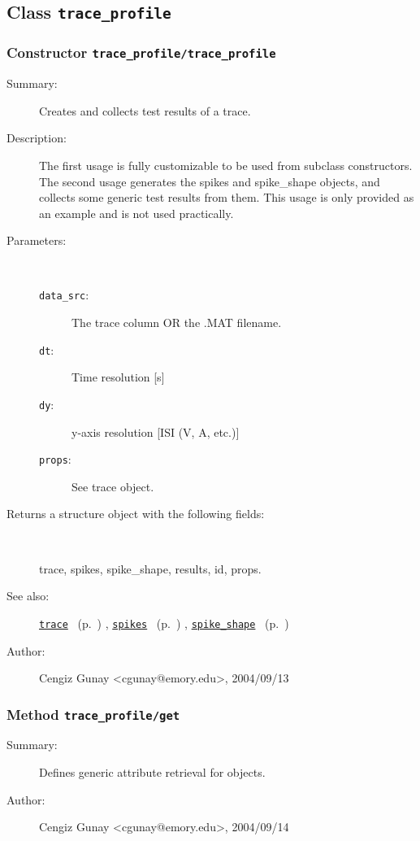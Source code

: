 \subsection{Class \texttt{trace\_profile}}%
%
\label{ref_trace_profile}%
\hypertarget{ref_trace_profile}{}%
\subsubsection[Constructor \texttt{trace\_profile}]{Constructor \texttt{trace\_profile/trace\_profile}}%
%
\label{ref_trace_profile__trace_profile}%
\hypertarget{ref_trace_profile__trace_profile}{}%
\begin{description}
\item[Summary:]Creates and collects test results of a trace.
%
%
\item[Description:]%
The first usage is fully customizable to be used from subclass constructors.
 The second usage generates the spikes and spike\_shape objects, and
 collects some generic test results from them. This usage is only provided
 as an example and is not used practically.
\item[Parameters:]~
\begin{description}%
\item[\texttt{data\_src}:]
 The trace column OR the .MAT filename.
\item[\texttt{dt}:]
 Time resolution [s]
\item[\texttt{dy}:]
 y-axis resolution [ISI (V, A, etc.)]
\item[\texttt{props}:]
 See trace object.
\end{description}%
%
\item[Returns a structure object with the following fields:]~

	trace, spikes, spike\_shape, results, id, props.
%
%
\item[See also:]%
\hyperlink{ref_trace}{\texttt{trace}}%
\ (p.~\pageref{ref_trace})%
%
, \hyperlink{ref_spikes}{\texttt{spikes}}%
\ (p.~\pageref{ref_spikes})%
%
, \hyperlink{ref_spike_shape}{\texttt{spike\_shape}}%
\ (p.~\pageref{ref_spike_shape})%
%
%
\item[Author:]%
Cengiz Gunay <cgunay@emory.edu>, 2004/09/13%
\end{description}
\methodline%
\subsubsection[Method \texttt{get}]{Method \texttt{trace\_profile/get}}%
%
\label{ref_trace_profile__get}%
\hypertarget{ref_trace_profile__get}{}%
\begin{description}
\item[Summary:]Defines generic attribute retrieval for objects.
%
%
%
%
%
%
%
\item[Author:]%
Cengiz Gunay <cgunay@emory.edu>, 2004/09/14%
\end{description}
\methodline%
